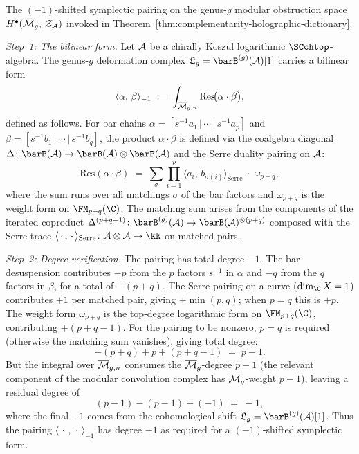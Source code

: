 \begin{construction}
\label{constr:residue-pairing}

The $(-1)$-shifted symplectic pairing on the genus-$g$
modular obstruction space
$H^\bullet(\overline{\mathcal{M}}_g,\,\mathcal{Z}_{\mathcal{A}})$
invoked in Theorem~\ref{thm:complementarity-holographic-dictionary}.

\medskip
\noindent
\textit{Step~1: The bilinear form.}\enspace
Let $\mathcal{A}$ be a chirally Koszul logarithmic $\SCchtop$-algebra.
The genus-$g$ deformation complex
$\mathfrak{L}_g = \barB^{(g)}(\cA)[1]$
carries a bilinear form
\begin{equation}\label{eq:residue-pairing-definition}
\langle \alpha,\, \beta \rangle_{-1}
\;:=\;
\int_{\overline{\mathcal{M}}_{g,n}}
\mathrm{Res}\!\bigl(\alpha \cdot \beta\bigr),
\end{equation}
defined as follows. For bar chains
$\alpha = [s^{-1}a_1 \,|\, \cdots \,|\, s^{-1}a_p]$
and
$\beta = [s^{-1}b_1 \,|\, \cdots \,|\, s^{-1}b_q]$,
the product $\alpha \cdot \beta$ is defined via the coalgebra
diagonal $\Delta\colon \barB(\cA) \to \barB(\cA) \otimes \barB(\cA)$
and the Serre duality pairing on $\mathcal{A}$:
\begin{equation}\label{eq:residue-pairing-matchings}
\mathrm{Res}(\alpha \cdot \beta)
\;=\;
\sum_{\sigma}
\prod_{i=1}^{p}
\langle a_i,\, b_{\sigma(i)} \rangle_{\mathrm{Serre}}
\;\cdot\;
\omega_{p+q},
\end{equation}
where the sum runs over all matchings $\sigma$ of the bar
factors and $\omega_{p+q}$ is the weight form on
$\FM_{p+q}(\C)$. The matching sum arises from the components of
the iterated coproduct
$\Delta^{(p+q-1)}\colon \barB^{(g)}(\cA)
\to \barB(\cA)^{\otimes(p+q)}$
composed with the Serre trace
$\langle\,\cdot\,,\,\cdot\,\rangle_{\mathrm{Serre}}
\colon \cA \otimes \cA \to \kk$
on matched pairs.

\medskip
\noindent
\textit{Step~2: Degree verification.}\enspace
The pairing has total degree $-1$. The bar desuspension
contributes $-p$ from the $p$ factors $s^{-1}$ in $\alpha$ and
$-q$ from the $q$ factors in $\beta$, for a total of $-(p+q)$.
The Serre pairing on a curve ($\dim_\C X = 1$) contributes
$+1$ per matched pair, giving $+\min(p,q)$; when $p = q$ this is
$+p$. The weight form $\omega_{p+q}$ is the top-degree
logarithmic form on $\FM_{p+q}(\C)$, contributing
$+(p+q-1)$. For the pairing to be nonzero, $p = q$ is required
(otherwise the matching sum vanishes), giving total degree:
\begin{equation}\label{eq:residue-pairing-degree}
-(p+q) + p + (p+q-1) \;=\; p - 1.
\end{equation}
But the integral over $\overline{\mathcal{M}}_{g,n}$ consumes the
$\overline{\mathcal{M}}_g$-degree $p - 1$ (the relevant component of the
modular convolution complex has $\overline{\mathcal{M}}_g$-weight $p-1$), leaving
a residual degree of
\[
(p-1) - (p-1) + (-1) \;=\; -1,
\]
where the final $-1$ comes from the cohomological shift
$\mathfrak{L}_g = \barB^{(g)}(\cA)[1]$. Thus the pairing
$\langle\,\cdot\,,\,\cdot\,\rangle_{-1}$ has degree $-1$ as
required for a $(-1)$-shifted symplectic form.


\end{construction}

